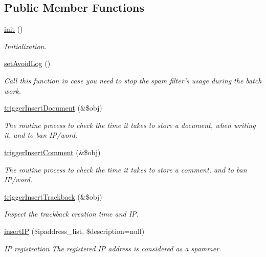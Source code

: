 \subsection*{Public Member Functions}
\begin{DoxyCompactItemize}
\item 
\hyperlink{classspamfilterController_a8204da601e789d60dbdfe0f692537e70}{init} ()
\begin{DoxyCompactList}\small\item\em Initialization. \end{DoxyCompactList}\item 
\hyperlink{classspamfilterController_a31282e59e182dca5e3f94e4c9122578d}{set\-Avoid\-Log} ()
\begin{DoxyCompactList}\small\item\em Call this function in case you need to stop the spam filter's usage during the batch work. \end{DoxyCompactList}\item 
\hyperlink{classspamfilterController_a9ed78c37a603b06cb067ecdc523a2ae4}{trigger\-Insert\-Document} (\&\$obj)
\begin{DoxyCompactList}\small\item\em The routine process to check the time it takes to store a document, when writing it, and to ban I\-P/word. \end{DoxyCompactList}\item 
\hyperlink{classspamfilterController_ac01aa63960909cc5c95bfae15ded5d99}{trigger\-Insert\-Comment} (\&\$obj)
\begin{DoxyCompactList}\small\item\em The routine process to check the time it takes to store a comment, and to ban I\-P/word. \end{DoxyCompactList}\item 
\hyperlink{classspamfilterController_ace7cf6178aa16638526af5d73a9554eb}{trigger\-Insert\-Trackback} (\&\$obj)
\begin{DoxyCompactList}\small\item\em Inspect the trackback creation time and I\-P. \end{DoxyCompactList}\item 
\hyperlink{classspamfilterController_aab95351e0ebeffec58d24354aa92e3f5}{insert\-I\-P} (\$ipaddress\-\_\-list, \$description=null)
\begin{DoxyCompactList}\small\item\em I\-P registration The registered I\-P address is considered as a spammer. \end{DoxyCompactList}\item 

\end{DoxyCompactItemize}
